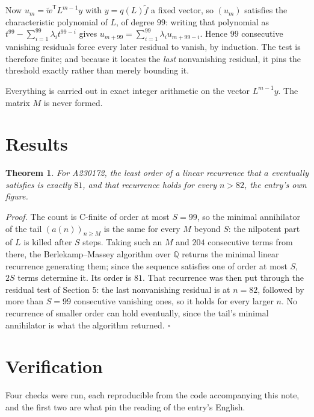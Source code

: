 \documentclass[11pt]{article}
\newtheorem{theorem}{Theorem}
\theoremstyle{definition}
\begin{document}
Now $u_m = \tilde w^{\mathsf T} L^{m-1} y$ with $y = q(L)\tilde f$ a fixed vector, so $(u_m)$ satisfies the characteristic polynomial of $L$, of degree $99$: writing that polynomial as $t^{99} - \sum_{i=1}^{99} \lambda_i t^{99-i}$ gives $u_{m+99} = \sum_{i=1}^{99} \lambda_i u_{m+99-i}$. Hence $99$ consecutive vanishing residuals force every later residual to vanish, by induction. The test is therefore finite; and because it locates the {\itshape last} nonvanishing residual, it pins the threshold exactly rather than merely bounding it.

Everything is carried out in exact integer arithmetic on the vector $L^{m-1}y$. The matrix $M$ is never formed.

\section{Results}

\begin{theorem} For A230172, the least order of a linear recurrence that $a$ eventually satisfies is exactly $81$, and that recurrence holds for every $n > 82$, the entry's own figure.\end{theorem}

{\itshape Proof.} The count is C-finite of order at most $S = 99$, so the minimal annihilator of the tail $(a(n))_{n \ge M}$ is the same for every $M$ beyond $S$: the nilpotent part of $L$ is killed after $S$ steps. Taking such an $M$ and $204$ consecutive terms from there, the Berlekamp--Massey algorithm over $\mathbb{Q}$ returns the minimal linear recurrence generating them; since the sequence satisfies one of order at most $S$, $2S$ terms determine it. Its order is $81$. That recurrence was then put through the residual test of Section 5: the last nonvanishing residual is at $n = 82$, followed by more than $S = 99$ consecutive vanishing ones, so it holds for every larger $n$. No recurrence of smaller order can hold eventually, since the tail's minimal annihilator is what the algorithm returned. $\square$

\section{Verification}

Four checks were run, each reproducible from the code accompanying this note, and the first two are what pin the reading of the entry's English.
\end{document}
